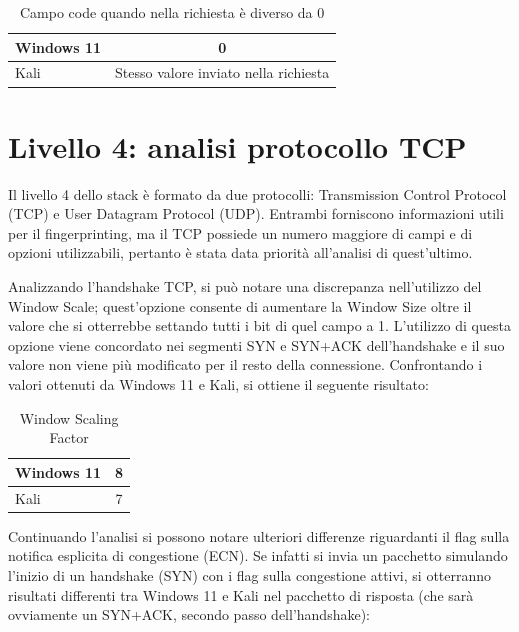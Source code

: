 \begin{table}[h]
	\centering
	\begin{tabular}{  l | c }
		\hline
		\rowcolor{blue!10} Windows 11 & 0
		\\
		\hline
		\rowcolor{red!10} Kali & Stesso valore inviato nella richiesta
		\\
		\hline

	\end{tabular}
	\caption{Campo code quando nella richiesta è diverso da 0}
	\label{tab:code}
\end{table}

\section{Livello 4: analisi protocollo TCP}
Il livello 4 dello stack è formato da due protocolli: Transmission Control Protocol (TCP) e User Datagram Protocol (UDP). Entrambi forniscono informazioni utili per il fingerprinting, ma il TCP possiede un numero maggiore di campi e di opzioni utilizzabili, pertanto è stata data priorità all'analisi di quest'ultimo.

Analizzando l'handshake TCP, si può notare una discrepanza nell'utilizzo del Window Scale; quest'opzione consente di aumentare la Window Size oltre il valore che si otterrebbe settando tutti i bit di quel campo a 1.
L'utilizzo di questa opzione viene concordato nei segmenti SYN e SYN+ACK dell'handshake e il suo valore non viene più modificato per il resto della connessione. Confrontando i valori ottenuti da Windows 11 e Kali, si ottiene il seguente risultato:
\\
\begin{table}[htb]
	\centering
	\begin{tabular}{ l | c }
		\hline
		\rowcolor{blue!10} Windows 11 & 8
		\\
		\hline
		\rowcolor{red!10} Kali & 7
		\\
		\hline
		
	\end{tabular}
	\caption{Window Scaling Factor}
	\label{tab:Window Scale}
\end{table}

Continuando l'analisi si possono notare ulteriori differenze riguardanti il flag sulla notifica esplicita di congestione (ECN).
Se infatti si invia un pacchetto simulando l'inizio di un handshake (SYN) con i flag sulla congestione attivi, si otterranno risultati differenti tra Windows 11 e Kali nel pacchetto di risposta (che sarà ovviamente un SYN+ACK, secondo passo dell'handshake):\\

